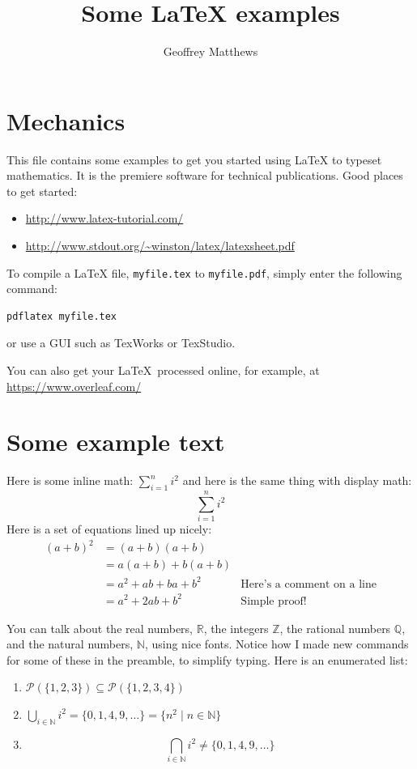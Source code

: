 \documentclass{article}
\title{Some \LaTeX{}  examples}
\author{Geoffrey Matthews}
\newcommand{\R}{\mathbb{R}}
\newcommand{\N}{\mathbb{N}}
\begin{document}
\maketitle

\section{Mechanics}
This file contains some examples to get you started using \LaTeX{} to
typeset mathematics.  It is the premiere software for technical
publications.  Good places to get started:
\begin{itemize}
\item \url{http://www.latex-tutorial.com/}
\item \url{http://www.stdout.org/~winston/latex/latexsheet.pdf}
\end{itemize}

To compile a \LaTeX{} file, {\tt myfile.tex} to {\tt myfile.pdf}, 
simply enter the
following command:
\begin{Verbatim}[frame=single]
pdflatex myfile.tex
\end{Verbatim}
or use a GUI such as TexWorks or TexStudio.

You can also get your \LaTeX\ processed online, for example, at \url{https://www.overleaf.com/}

\section{Some example text}
Here is some inline math:  $\sum_{i=1}^{n} i^2$ and
here is the same thing with display math:
\[
\sum_{i=1}^{n} i^2
\]
Here is a set of equations lined up nicely:
\begin{align*}
(a+b)^2 &= (a+b)(a+b) \\
        &= a(a+b) + b(a+b) \\
        &= a^2 + ab + ba + b^2 &\mbox{Here's a comment on a line}\\
        &= a^2 + 2ab + b^2     &\mbox{Simple proof!}
\end{align*}

You can talk about the real numbers, $\R$, the integers $\mathbb{Z}$, the
rational numbers $\mathbb{Q}$, and the natural numbers,
$\N$, using nice fonts.  Notice how I made new commands for some of these in
the preamble, to simplify typing.
Here is an enumerated list:
\begin{enumerate}

\item $\mathcal{P}(\{1,2,3\}) \subseteq \mathcal{P}(\{1,2,3,4\})$

\item
$
\bigcup_{i\in\N}i^2 = \{0,1,4,9,\ldots\} = \{n^2 \mid n \in \mathbb{N}\}
$

\item
\[
\bigcap_{i\in\N}i^2 \not= \{0,1,4,9,\ldots\}
\]

\end{enumerate}
\end{document}
